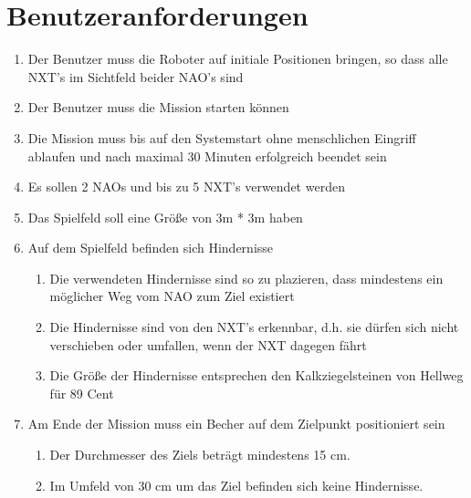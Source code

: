 \section{Benutzeranforderungen}
\begin{enumerate}
    \item Der Benutzer muss die Roboter auf initiale Positionen bringen, so dass alle NXT's im Sichtfeld beider NAO's sind

    \item Der Benutzer muss die Mission starten können

    \item Die Mission muss bis auf den Systemstart ohne menschlichen Eingriff ablaufen und nach maximal 30 Minuten erfolgreich beendet sein

    \item Es sollen 2 NAOs und bis zu 5 NXT's verwendet werden

    \item Das Spielfeld soll eine Größe von 3m * 3m haben

    \item Auf dem Spielfeld befinden sich Hindernisse
    \begin{enumerate}
        \item Die verwendeten Hindernisse sind so zu plazieren, dass mindestens ein möglicher Weg vom NAO zum Ziel existiert

        \item Die Hindernisse sind von den NXT's erkennbar, d.h. sie dürfen sich nicht verschieben oder umfallen, wenn der NXT dagegen fährt

        \item Die Größe der Hindernisse entsprechen den Kalkziegelsteinen von Hellweg für 89 Cent
    \end{enumerate}
    \item Am Ende der Mission muss ein Becher auf dem Zielpunkt positioniert sein
    \begin{enumerate}
        \item Der Durchmesser des Ziels beträgt mindestens 15 cm.

        \item Im Umfeld von 30 cm um das Ziel befinden sich keine Hindernisse.
    \end{enumerate}
\end{enumerate}
